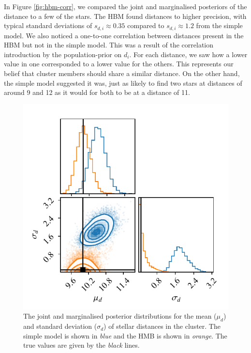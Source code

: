 In Figure \ref{fig:hbm-corr}, we compared the joint and marginalised posteriors of the distance to a few of the stars. The HBM found distances to higher precision, with typical standard deviations of \(s_{d,i} \approx 0.35\) compared to \(s_{d,i} \approx 1.2\) from the simple model. We also noticed a one-to-one correlation between distances present in the HBM but not in the simple model. This was a result of the correlation introduction by the population-prior on \(d_i\). For each distance, we saw how a lower value in one corresponded to a lower value for the others. This represents our belief that cluster members should share a similar distance. On the other hand, the simple model suggested it was, just as likely to find two stars at distances of around 9 and 12 as it would for both to be at a distance of 11.

\begin{figure}[tb]
    \centering
    \includegraphics{figures/hbm-global.pdf}
    \caption[The joint and marginalised posterior distributions for the mean and standard deviation of stellar distances in the cluster]{The joint and marginalised posterior distributions for the mean (\(\mu_d\)) and standard deviation (\(\sigma_d\)) of stellar distances in the cluster. The simple model is shown in \emph{blue} and the HMB is shown in \emph{orange}. The true values are given by the \emph{black} lines.}
    \label{fig:hbm-global}
\end{figure}

